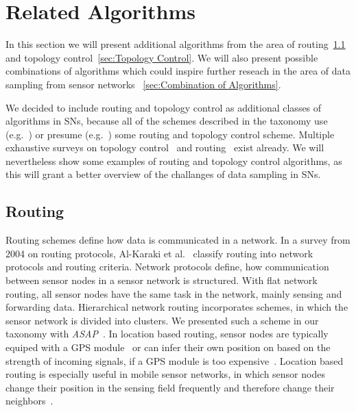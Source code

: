\section{Related Algorithms}
\label{sec:Related Algorithms}

In this section we will present additional algorithms from the area of
routing~\ref{sec:Routing} and topology control~\ref{sec:Topology Control}. We
will also present possible combinations of algorithms which could inspire
further reseach in the area of data sampling from sensor networks
~\ref{sec:Combination of Algorithms}.

We decided to include routing and topology control as additional classes of
algorithms in \acp{SN}, because all of the schemes described in the taxonomy
use (e.g.~\cite{padhy2006utility}) or presume
(e.g.~\cite{silberstein2006constraint}) some routing and topology control
scheme. Multiple exhaustive surveys on topology control~\cite{aziz2013survey,
li2013survey} and routing~\cite{al2004routing, pantazis2013energy,
singh2010routing} exist already. We will nevertheless show some examples of
routing and topology control algorithms, as this will grant a better overview
of the challanges of data sampling in \acp{SN}.

\subsection{Routing}
\label{sec:Routing}

Routing schemes define how data is communicated in a network. In a survey from
2004 on routing protocols, Al-Karaki et al.~\cite{al2004routing} classify
routing into network protocols and routing criteria. Network protocols define,
how communication between sensor nodes in a sensor network is structured. With flat
network routing, all sensor nodes have the same task in the network, mainly sensing
and forwarding data. Hierarchical network routing incorporates schemes, in
which the sensor network is divided into clusters. We presented such a scheme
in our taxonomy with \textit{ASAP}~\cite{gedik2007asap}. In location based
routing, sensor nodes are typically equiped with a GPS
module~\cite{xu2001geography} or can infer their own position on based on the
strength of incoming signals, if a GPS module is too
expensive~\cite{hu2004localization}. Location based routing is especially
useful in mobile sensor networks, in which sensor nodes change their position in the
sensing field frequently and therefore change their
neighbors~\cite{hu2004localization}.

